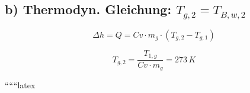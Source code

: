 \subsection*{b) Thermodyn. Gleichung: $T_{g,2} = T_{B,w,2}$}

\[
\Delta h = Q = Cv \cdot m_g \cdot (T_{g,2} - T_{g,1})
\]

\[
T_{g,2} = \frac{T_{1,g}}{Cv \cdot m_g} = 273 \, K
\]

``````latex